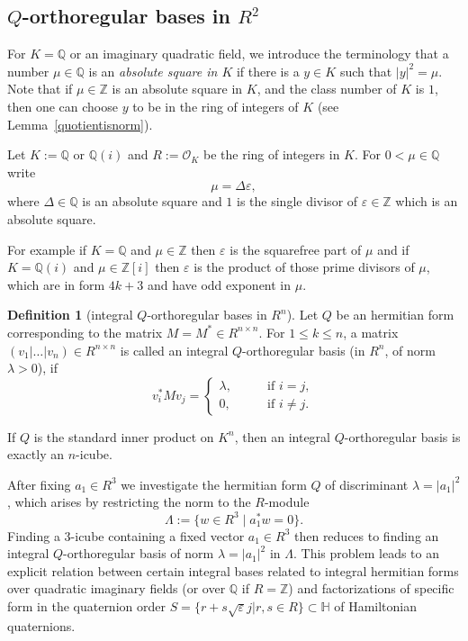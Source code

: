 \documentclass[11pt]{amsart}
\newcommand{\ZZ}{\mathbb{Z}}
\newcommand{\QQ}{\mathbb{Q}}
\theoremstyle{definition}
\newtheorem*{definition}{Definition}
\theoremstyle{remark}
\begin{document}
\subsection{$Q$-orthoregular bases in $R^2$}

For $K=\QQ$ or an imaginary quadratic field, we introduce the terminology that a number $\mu\in\QQ$ is an \emph{absolute square in $K$} if there is a $y\in K$ such that $|y|^2=\mu$. Note that if $\mu\in\ZZ$ is an absolute square in $K$, and the class number of $K$ is $1$, then one can choose $y$ to be in the ring of integers of $K$ (see Lemma~\ref{quotientisnorm}).

Let $K:=\mathbb Q$ or $\mathbb Q(i)$ and $R:=\mathcal O_K$ be the ring of integers in $K$. For $0<\mu\in\mathbb Q$ write
\begin{equation}\label{normfree}
\mu=\Delta\varepsilon,
\end{equation}
where $\Delta\in\mathbb Q$ is an absolute square
and $1$ is the single divisor of $\varepsilon\in\mathbb Z$ which is an absolute square.

For example if $K=\mathbb Q$ and $\mu\in\mathbb Z$ then $\varepsilon$ is the squarefree part of $\mu$ and if $K=\mathbb Q(i)$ and $\mu\in\mathbb Z[i]$ then $\varepsilon$ is the product of those prime divisors of $\mu$, which are in form $4k+3$ and have odd exponent in $\mu$.

\begin{definition}[integral $Q$-orthoregular bases in $R^n$] 
Let $Q$ be an hermitian form corresponding to the matrix $M=M^*\in R^{n\times n}$. 
For $1\leq k\leq n$, a matrix $(v_1|\dotsc|v_n)\in R^{n\times n}$ is called an integral $Q$-orthoregular basis (in $R^n$, of norm $\lambda > 0$),
if
\[
v_i^*M v_j = \begin{cases} \lambda, \qquad & \text{if $i=j$}, \\ 0, & \text{if $i\neq j$.} \end{cases}
\]
\end{definition}

If $Q$ is the standard inner product on $K^n$, then an integral $Q$-orthoregular basis is exactly an $n$-icube.


After fixing $a_1\in R^3$ we investigate the hermitian form $Q$ of discriminant $\lambda=|a_1|^2$, which arises by restricting the norm to the $R$-module
\begin{equation}\label{Lambdalattice}
\Lambda:=\{w\in R^3 \mid a_1^*w=0\}.
\end{equation}
Finding a 3-icube containing a fixed vector $a_1\in R^3$ then reduces to finding an integral $Q$-orthoregular basis of norm $\lambda=|a_1|^2$ in $\Lambda$. 
This problem leads to an explicit relation between certain integral bases related to integral hermitian forms over quadratic imaginary fields (or over $\mathbb Q$ if $R=\mathbb Z$) and factorizations of specific form in the quaternion order $S=\{r+s\sqrt{\varepsilon}j|r,s\in R\}\subset \mathbb H$ of Hamiltonian quaternions.
\end{document}
